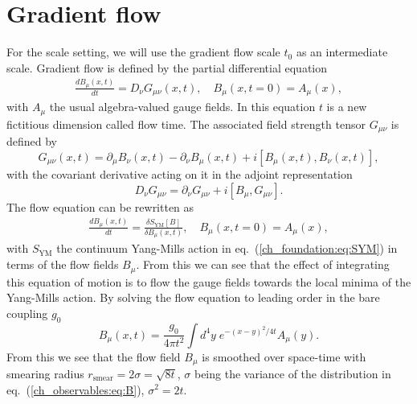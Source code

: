 
\section{Gradient flow}
\label{ch_observables:sec:Flow}

For the scale setting, we will use the gradient flow scale $t_0$ as an intermediate scale. Gradient flow is defined by the partial differential equation~\citep{Luscher:2010we,1006.4518}
\begin{gather}
\label{ch_observables:eq:flow}
\frac{dB_{\mu}(x,t)}{dt}=D_{\nu}G_{\mu\nu}(x,t), \quad B_{\mu}(x,t=0)=A_{\mu}(x),
\end{gather}
with $A_{\mu}$ the usual algebra-valued gauge fields. In this equation $t$ is a new fictitious dimension called flow time. The associated field strength tensor $G_{\mu\nu}$ is defined by
\begin{equation}
G_{\mu\nu}(x,t)=\partial_{\mu}B_{\nu}(x,t)-\partial_{\nu}B_{\mu}(x,t)+i\left[B_{\mu}(x,t),B_{\nu}(x,t)\right],
\end{equation}
with the covariant derivative acting on it in the adjoint representation
\begin{equation}
D_{\nu}G_{\mu\nu}=\partial_{\nu}G_{\mu\nu}+i\left[B_{\mu},G_{\mu\nu}\right].
\end{equation}
The flow equation can be rewritten as
\begin{gather}
\frac{dB_{\mu}(x,t)}{dt}=\frac{\delta S_{\textrm{YM}}[B]}{\delta B_{\mu}(x,t)}, \quad B_{\mu}(x,t=0)=A_{\mu}(x),
\end{gather}
with $S_{\textrm{YM}}$ the continuum Yang-Mills action in eq.~(\ref{ch_foundation:eq:SYM}) in terms of the flow fields $B_{\mu}$. From this we can see that the effect of integrating this equation of motion is to flow the gauge fields towards the local minima of the Yang-Mills action. By solving the flow equation to leading order in the bare coupling $g_0$
\begin{equation}
\label{ch_observables:eq:B}
B_{\mu}(x,t)=\frac{g_0}{4\pi t^2}\int d^4y\;e^{-(x-y)^2/4t}A_{\mu}(y).
\end{equation}
From this we see that the flow field $B_{\mu}$ is smoothed over space-time with smearing radius $r_{\textrm{smear}}=2\sigma=\sqrt{8t}$, $\sigma$ being the variance of the distribution in eq.~(\ref{ch_observables:eq:B}), $\sigma^2=2t$.

